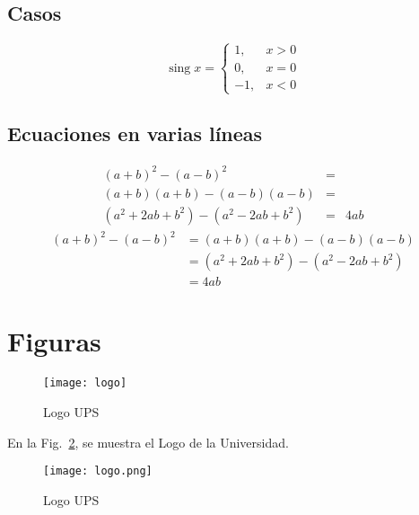 \documentclass{article}
\theoremstyle{mytheoremstyle}
\theoremstyle{mytheoremstyle}
\theoremstyle{myproblemstyle}
\begin{document}
    \subsection{Casos}
    \[
    \operatorname{sing} x=
    \begin{cases}
        1, & x>0 \\
        0, & x=0 \\
        -1, & x<0
    \end{cases}
    \]
    
    \subsection{Ecuaciones en varias líneas}
    \begin{eqnarray}
        (a+b)^2-(a-b)^2 &=& \\
        (a+b)(a+b)-(a-b)(a-b) &=& \\
        (a^2+2ab+b^2)-(a^2-2ab+b^2) &=& 4ab
    \end{eqnarray}
    \begin{align}
        (a+b)^2-(a-b)^2 &= (a+b)(a+b)-(a-b)(a-b) \\
        &= (a^2+2ab+b^2)-(a^2-2ab+b^2) \\
        &= 4ab
    \end{align}
    
    \section{Figuras}
    \begin{figure}[h]
        \centering
        \texttt{[image: logo]}
        \caption{Logo UPS}
        \label{F1}
    \end{figure}
    En la Fig.~\ref{F1}, se muestra el Logo de la Universidad.
    \begin{figure}[h]
        \centering
        \texttt{[image: logo.png]}
        \caption{Logo UPS}
        \label{F1}
    \end{figure}
    
\end{document}
